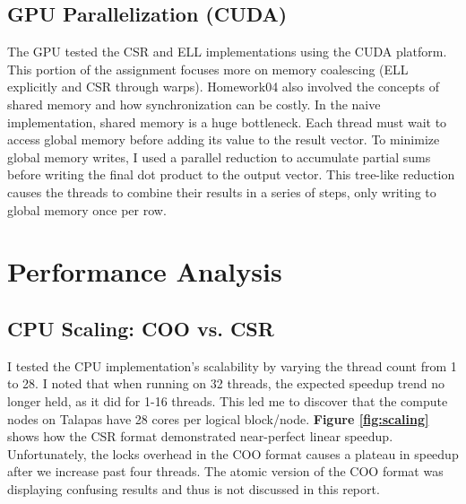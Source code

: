 \documentclass[11pt, letterpaper]{article}
\begin{document}
\subsection{GPU Parallelization (CUDA)}
The GPU tested the CSR and ELL implementations using the CUDA platform. This portion of the assignment focuses more on memory coalescing (ELL explicitly and CSR through warps). Homework04 also involved the concepts of shared memory and how synchronization can be costly. In the naive implementation, shared memory is a huge bottleneck. Each thread must wait to access global memory before adding its value to the result vector. To minimize global memory writes, I used a parallel reduction to accumulate partial sums before writing the final dot product to the output vector. This tree-like reduction causes the threads to combine their results in a series of steps, only writing to global memory once per row.

\section{Performance Analysis}
\subsection{CPU Scaling: COO vs. CSR}
I tested the CPU implementation's scalability by varying the thread count from 1 to 28. I noted that when running on 32 threads, the expected speedup trend no longer held, as it did for 1-16 threads. This led me to discover that the compute nodes on Talapas have 28 cores per logical block/node. \textbf{Figure \ref{fig:scaling}} shows how the CSR format demonstrated near-perfect linear speedup. Unfortunately, the locks overhead in the COO format causes a plateau in speedup after we increase past four threads. The atomic version of the COO format was displaying confusing results and thus is not discussed in this report.
\end{document}
